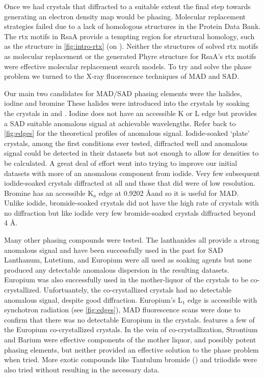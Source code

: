  Once we had crystals that diffracted to a suitable extent the final step towards generating an electron density map would be phasing. Molecular replacement strategies failed due to a lack of homologous structures in the Protein Data Bank. The \ac{rtx}  motifs in RsaA provide a tempting region for structural homology, such as the structure in \cref{fig:intro-rtx} (on ). Neither the structures of solved \ac{rtx} motifs as molecular replacement  or the generated Phyre structure for RsaA's \ac{rtx} motifs were effective molecular replacement search models. To try and solve the phase problem we turned to the X-ray fluorescence techniques of \ac{MAD} and \ac{SAD}. 

Our main two candidates for \ac{MAD}/\ac{SAD} phasing elements were the halides, iodine and  bromine These halides were introduced into the crystals by soaking the crystals in  and . Iodine does not have an accessible K or L edge but provides a \ac{SAD}  suitable anomalous signal at achievable wavelengths. Refer back to \cref{fig:edges} for the theoretical profiles of anomalous signal. Iodide-soaked `plate' crystals, among the first conditions ever tested, diffracted well and anomalous signal could be detected in their datasets but not enough to allow for densities to be calculated. A great deal of effort went into trying to improve our initial datasets with more of an anomalous component from iodide. Very few subsequent iodide-soaked crystals diffracted at all  and those that did were of low resolution. Bromine has an accessible K$_{a}$ edge at 0.9202 \AA and so it is useful for \ac{MAD}. Unlike iodide, bromide-soaked crystals did not have the high rate of crystals  with no diffraction but like iodide very few bromide-soaked crystals diffracted beyond 4 \AA{}. 

Many other phasing compounds were tested. The lanthanides all provide a strong  anomalous signal and have been successfully used in the past for \ac{SAD} Lanthanum, Lutetium, and Europium were all used as soaking agents but none produced any detectable anomalous dispersion in the resulting datasets. Europium was also successfully used in the mother-liquor of the crystals to be co-crystallized. Unfortuantely, the co-crystallized crystals had no detectable anomalous signal, despite good diffraction. Europium's L$_{1}$ edge is accessible with synchotron radiation (see \cref{fig:edges}), \ac{MAD} fluorescence scans were done to confirm that there was no detectable Europium in the crystals.  features a few of the Europium co-crystallized crystals. In the vein of co-crystallization, Strontium and Barium were effective components of the mother liquor, and possibly potent phasing elements, but neither provided an effective solution to the phase problem when tried. More exotic compounds like Tantulum bromide () and  triiodide were also tried without resulting in the necessary data. 
 
